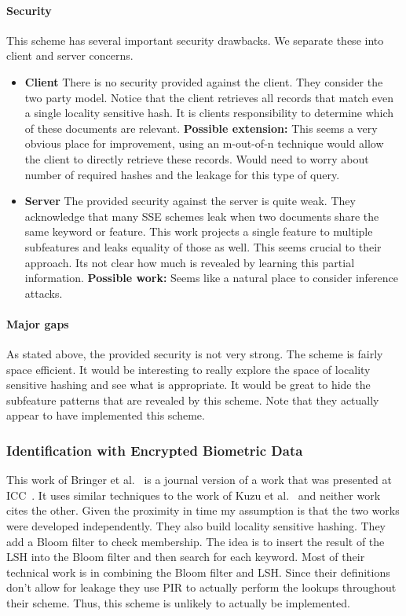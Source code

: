 \documentclass[11pt]{article}
\theoremstyle{remark}
\begin{document}
\paragraph{Security}  This scheme has several important security drawbacks.  We separate these into client and server concerns.

\begin{itemize}
\item \textbf{Client} There is no security provided against the client.  They consider the two party model.  Notice that the client retrieves all records that match even a single locality sensitive hash.  It is clients responsibility to determine which of these documents are relevant.  \textbf{Possible extension:} This seems a very obvious place for improvement, using an m-out-of-n technique would allow the client to directly retrieve these records.  Would need to worry about number of required hashes and the leakage for this type of query.
\item \textbf{Server} The provided security against the server is quite weak.  They acknowledge that many SSE schemes leak when two documents share the same keyword or feature.  This work projects a single feature to multiple subfeatures and leaks equality of those as well.  This seems crucial to their approach.  Its not clear how much is revealed by learning this partial information.  \textbf{Possible work:} Seems like a natural place to consider inference attacks.
\end{itemize}

\paragraph{Major gaps} As stated above, the provided security is not very strong.  The scheme is fairly space efficient.  It would be interesting to really explore the space of locality sensitive hashing and see what is appropriate.  It would be great to hide the subfeature patterns that are revealed by this scheme.  Note that they actually appear to have implemented this scheme.

\subsubsection{Identification with Encrypted Biometric Data}
This work of Bringer et al.~\cite{bringer2011identification} is a journal version of a work that was presented at ICC~\cite{bringer2009error}.  It uses similar techniques to the work of Kuzu et al.~\cite{kuzu2012efficient} and neither work cites the other.  Given the proximity in time my assumption is that the two works were developed independently.  They also build locality sensitive hashing.  They add a Bloom filter to check membership.  The idea is to insert the result of the LSH into the Bloom filter and then search for each keyword.  Most of their technical work is in combining the Bloom filter and LSH.  Since their definitions don't allow for leakage they use PIR to actually perform the lookups throughout their scheme.  Thus, this scheme is unlikely to actually be implemented.
\end{document}
